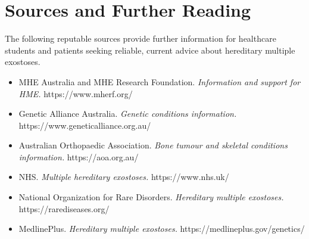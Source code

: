 \section*{Sources and Further Reading}
The following reputable sources provide further information for healthcare students and patients seeking reliable, current advice about hereditary multiple exostoses.

\begin{itemize}
    \item MHE Australia and MHE Research Foundation. \textit{Information and support for HME.} https://www.mherf.org/
    \item Genetic Alliance Australia. \textit{Genetic conditions information.} https://www.geneticalliance.org.au/
    \item Australian Orthopaedic Association. \textit{Bone tumour and skeletal conditions information.} https://aoa.org.au/
    \item NHS. \textit{Multiple hereditary exostoses.} https://www.nhs.uk/
    \item National Organization for Rare Disorders. \textit{Hereditary multiple exostoses.} https://rarediseases.org/
    \item MedlinePlus. \textit{Hereditary multiple exostoses.} https://medlineplus.gov/genetics/
\end{itemize}
